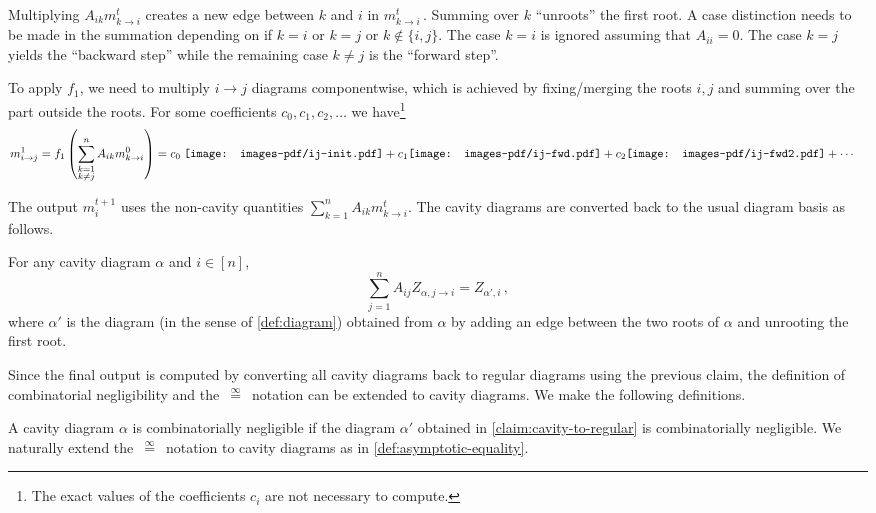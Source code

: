 \documentclass[12pt]{article}
\newcommand{\eqinf}{\,\overset{\infty}{=}\,}
\begin{document}
Multiplying $A_{ik}m_{k \to i}^t$ creates a new edge between
$k$ and $i$ in $m_{k \to i}^t\,$. Summing over $k$ ``unroots'' the first root.
A case
distinction needs to be made in the summation depending on if $k = i$ or $k = j$ or $k \not \in \{i,j\}$.
The case $k = i$ is ignored assuming that $A_{ii} = 0$.
The case $k = j$ yields the ``backward step'' while the remaining case $k \neq j$ is the ``forward step''.

To apply $f_1$, we need to multiply $i \to j$ diagrams componentwise, which is achieved by fixing/merging the roots $i,j$
and summing over the part outside the roots.
For some coefficients $c_0, c_1, c_2, \dots$ we have\footnote{The exact values of the coefficients $c_i$ are not necessary to compute.}
\begin{align*}
    m_{i \to j}^1 = f_1\left(\sum_{\substack{k = 1\\k \neq j}}^n A_{ik} m_{k \to i}^0\right) &= c_0\;\vcenter{\hbox{\texttt{[image: images-pdf/ij-init.pdf]}}} + c_1 \vcenter{\hbox{\texttt{[image: images-pdf/ij-fwd.pdf]}}} + c_2 \vcenter{\hbox{\texttt{[image: images-pdf/ij-fwd2.pdf]}}} + \cdots
\end{align*}


The output $m^{t+1}_i$ uses the non-cavity quantities $\sum_{k=1}^n A_{ik} m_{k\to i}^t$. The cavity diagrams are converted back to the usual diagram basis as follows.

\begin{claim}\label{claim:cavity-to-regular}
    For any cavity diagram $\alpha$ and $i\in [n]$,
    \[
        \sum_{j=1}^n A_{ij} Z_{\alpha,j\to i} = Z_{\alpha',i}\,,
    \]
    where $\alpha'$ is the diagram (in the sense of \cref{def:diagram}) obtained from $\alpha$ by adding an edge between the two roots of $\alpha$ and unrooting the first root.
\end{claim}

Since the final output is computed by converting all cavity diagrams back to regular diagrams using the previous claim, the definition of combinatorial negligibility and the $\eqinf$ notation can be extended to cavity diagrams.
We make the following definitions.

\begin{definition}
    A cavity diagram $\alpha$ is combinatorially negligible if the diagram $\alpha'$ obtained in \cref{claim:cavity-to-regular} is combinatorially negligible. We naturally extend the $\eqinf$ notation to cavity diagrams as in \cref{def:asymptotic-equality}.
\end{definition}
\end{document}

